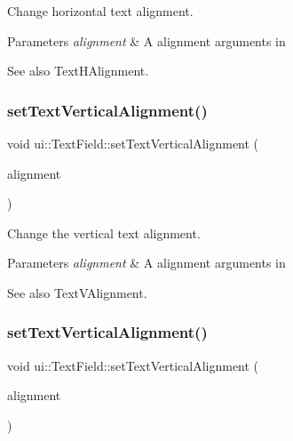 Change horizontal text alignment. 


\begin{DoxyParams}{Parameters}
{\em alignment} & A alignment arguments in \\
\hline
\end{DoxyParams}
\begin{DoxySeeAlso}{See also}
{\ttfamily Text\+H\+Alignment}. 
\end{DoxySeeAlso}
\mbox{\label{classui_1_1TextField_a05d3b9f37bbffee99ec903ef59ebca56}} 
\subsubsection{\texorpdfstring{set\+Text\+Vertical\+Alignment()}{setTextVerticalAlignment()}\hspace{0.1cm}{\footnotesize\ttfamily [1/2]}}
{\footnotesize\ttfamily void ui\+::\+Text\+Field\+::set\+Text\+Vertical\+Alignment (\begin{DoxyParamCaption}\item[{Text\+V\+Alignment}]{alignment }\end{DoxyParamCaption})}



Change the vertical text alignment. 


\begin{DoxyParams}{Parameters}
{\em alignment} & A alignment arguments in \\
\hline
\end{DoxyParams}
\begin{DoxySeeAlso}{See also}
{\ttfamily Text\+V\+Alignment}. 
\end{DoxySeeAlso}
\mbox{\label{classui_1_1TextField_a05d3b9f37bbffee99ec903ef59ebca56}} 
\subsubsection{\texorpdfstring{set\+Text\+Vertical\+Alignment()}{setTextVerticalAlignment()}\hspace{0.1cm}{\footnotesize\ttfamily [2/2]}}
{\footnotesize\ttfamily void ui\+::\+Text\+Field\+::set\+Text\+Vertical\+Alignment (\begin{DoxyParamCaption}\item[{Text\+V\+Alignment}]{alignment }\end{DoxyParamCaption})}



